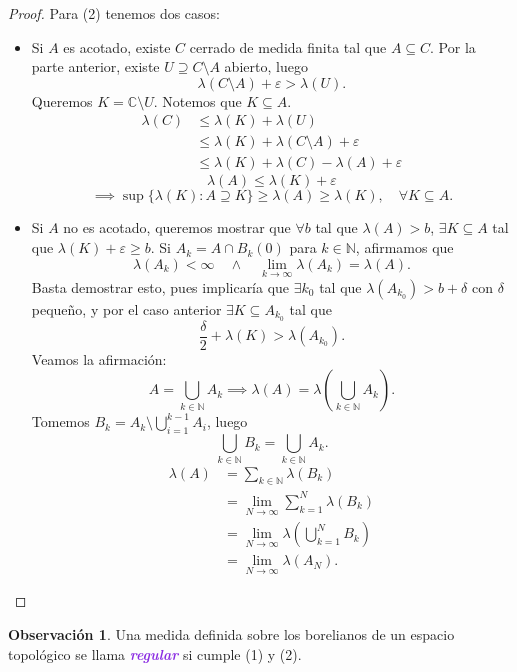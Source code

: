 \documentclass{article}
\theoremstyle{definition}
\newtheorem*{obs}{Observación}
\theoremstyle{remark}
\numberwithin{equation}{section}
\newcommand{\C}{\mathbb{C}}
\newcommand{\N}{\mathbb{N}}
\newcommand{\e}{\varepsilon}
\newcommand{\lam}{\lambda}
\newcommand{\oo}{\infty}
\newcommand{\br}[1]{\left( #1 \right)}
\newcommand{\ds}{\displaystyle}
\newcommand{\wea}[1]{\textcolor{BlueViolet}{\textbf{\emph{#1}}}}
\begin{document}
\begin{proof}
  Para (2) tenemos dos casos:
  \begin{itemize}
    \item Si $A$ es acotado, existe $C$ cerrado de medida finita tal que $A \subseteq C$. Por la parte anterior, existe $U \supseteq C \setminus A$ abierto, luego
    \[\lam(C \setminus A) + \e > \lam(U).\]
    Queremos $K = \C \setminus U$. Notemos que $K \subseteq A$.
    \begin{align*}
      \lam(C) &\leq \lam(K) + \lam(U) \\
      &\leq \lam(K) + \lam(C \setminus A) + \e \\
      &\leq \lam(K) + \lam(C) - \lam(A) + \e
    \end{align*}
    \[\lam(A) \leq \lam(K) + \e\]
    \[\implies \sup\{\lam(K) \colon A \supseteq K\} \geq \lam(A) \geq \lam(K), \quad \forall K \subseteq A.\]
    \item Si $A$ no es acotado, queremos mostrar que $\forall b$ tal que $\lam(A) > b$, $\exists K \subseteq A$ tal que $\lam(K) + \e \geq b$.
    Si $A_k = A \cap B_k(0)$ para $k \in \N$, afirmamos que
    \[\lam(A_k) < \oo \quad\land\quad \lim_{k\to\oo} \lam(A_k) = \lam(A).\]
    Basta demostrar esto, pues implicaría que $\exists k_0$ tal que $\lam(A_{k_0}) > b + \delta$ con $\delta$ pequeño, y por el caso anterior $\exists K \subseteq A_{k_0}$ tal que
    \[\frac\delta2 + \lam(K) > \lam(A_{k_0}).\]
    Veamos la afirmación:
    \[A = \bigcup_{k \in \N} A_k \implies \lam(A) = \lam\br{\bigcup_{k \in \N} A_k}.\]
    Tomemos $\ds B_k = A_k \setminus \bigcup_{i=1}^{k-1} A_i$, luego
    \[\bigcup_{k \in \N} B_k = \bigcup_{k \in \N} A_k.\]
    \begin{align*}
      \lam(A) &= \sum_{k \in \N} \lam(B_k) \\
      &= \lim_{N\to\oo} \sum_{k=1}^N \lam(B_k) \\
      &= \lim_{N\to\oo} \lam\br{\bigcup_{k=1}^N B_k} \\
      &= \lim_{N\to\oo} \lam(A_N).
    \end{align*}
  \end{itemize}
\end{proof}

\begin{obs}
  Una medida definida sobre los borelianos de un espacio topológico se llama \wea{regular} si cumple (1) y (2). %
\end{obs}
\end{document}
